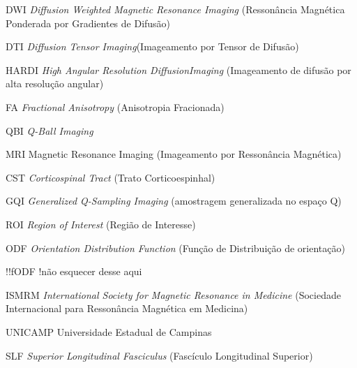 \documentclass[
    12pt,                %
    oneside,            %
    a4paper,            %
    english,            %
    french,                %
    spanish,            %
    brazil                %
    ]{abntex2}
\begin{document}
\listoffigures*
\cleardoublepage

\listoftables*
\cleardoublepage

\begin{siglas}
\item[DWI] \textit{Diffusion Weighted Magnetic Resonance Imaging} (Ressonância Magnética Ponderada por Gradientes de Difusão)
  
\item[DTI] \textit{Diffusion Tensor Imaging}(Imageamento por Tensor de Difusão)

\item[HARDI] \textit{High Angular Resolution DiffusionImaging} (Imageamento de difusão por alta resolução angular)

\item[FA] \textit{Fractional Anisotropy} (Anisotropia Fracionada)

\item[QBI] \textit{Q-Ball Imaging}

\item[MRI] Magnetic Resonance Imaging (Imageamento por Ressonância Magnética)

\item[CST] \textit{Corticospinal Tract} (Trato Corticoespinhal)

\item[GQI] \textit{Generalized Q-Sampling Imaging} (amostragem generalizada no espaço Q)

\item[ROI] \textit{Region of Interest} (Região de Interesse)

\item[ODF] \textit{Orientation Distribution Function} (Função de Distribuição de orientação)

\item[!!fODF] !não esquecer desse aqui

\item[ISMRM]    \textit{International Society for Magnetic Resonance in Medicine} (Sociedade Internacional para Ressonância Magnética em Medicina)

\item[UNICAMP] Universidade Estadual de Campinas

\item[SLF] \textit{Superior Longitudinal Fasciculus} (Fascículo Longitudinal Superior)


\end{siglas}
\end{document}
